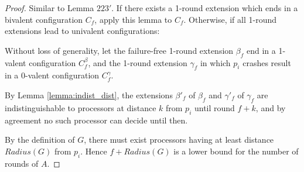 \begin{proof}

Similar to Lemma $223'$.
If there exists a 1-round extension which ends in a bivalent configuration $C_f$,
apply this lemma to $C_f$. Otherwise, if all 1-round extensions lead to univalent
configurations:

Without loss of generality, let the failure-free 1-round extension $\beta_f$
end in a 1-valent configuration $C^\beta_f$, and the 1-round extension $\gamma_f$ in which
$p_i$ crashes result in a 0-valent configuration $C^\gamma_f$.

By Lemma \ref{lemma:indist_dist}, the extensions $\beta'_f$ of $\beta_f$ and 
$\gamma'_f$ of $\gamma_f$ are indistinguishable to processors at distance $k$
from $p_i$ until round $f+k$, and by agreement no such processor can decide
until then.

By the definition of $G$, there must exist processors having at least distance
$Radius(G)$ from $p_i$. Hence $f+Radius(G)$ is a lower bound for the number
of rounds of $A$.
\end{proof}
